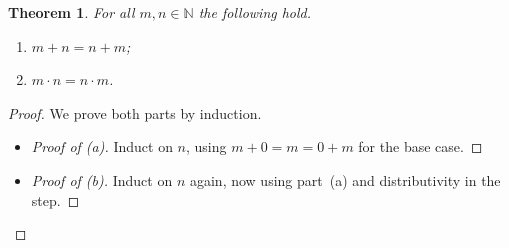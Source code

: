 \documentclass{article}
\newtheorem{theorem}{Theorem}
\theoremstyle{definition}
\newcommand{\N}{\mathbb{N}}
\begin{document}
\begin{theorem}
For all $m, n \in \N$ the following hold.
\begin{enumerate}
  \item[(a)] $m + n = n + m$;
  \item[(b)] $m \cdot n = n \cdot m$.
\end{enumerate}
\end{theorem}

\begin{proof}
We prove both parts by induction.
\begin{itemize}
  \item[(a)] \begin{proof}[Proof of (a)]
  Induct on $n$, using $m + 0 = m = 0 + m$ for the base case.
  \end{proof}
  \item[(b)] \begin{proof}[Proof of (b)]
  Induct on $n$ again, now using part~(a) and distributivity in the step.
  \end{proof}
\end{itemize}
\end{proof}
\end{document}
